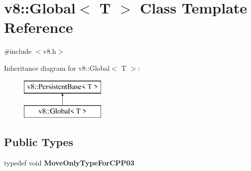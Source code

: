 \hypertarget{classv8_1_1_global}{}\section{v8\+:\+:Global$<$ T $>$ Class Template Reference}
\label{classv8_1_1_global}


{\ttfamily \#include $<$v8.\+h$>$}

Inheritance diagram for v8\+:\+:Global$<$ T $>$\+:\begin{figure}[H]
\begin{center}
\leavevmode
\includegraphics[height=2.000000cm]{classv8_1_1_global}
\end{center}
\end{figure}
\subsection*{Public Types}
\begin{DoxyCompactItemize}
\item 
\hypertarget{classv8_1_1_global_a295826e79781fe585904e652884db72f}{}typedef void {\bfseries Move\+Only\+Type\+For\+C\+P\+P03}\label{classv8_1_1_global_a295826e79781fe585904e652884db72f}

\end{DoxyCompactItemize}
